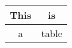 \documentclass{article}
\begin{document}
\begin{tabular}{|c|c|}
    \hline
    This & is \\ \hline
    a & table \\ \hline
\end{tabular}
\end{document}
